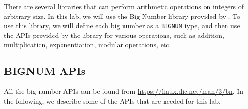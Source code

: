 There are several libraries that can perform arithmetic operations on integers of 
arbitrary size. In this lab, we will use the Big Number library provided 
by \openssl. To use this library, we will define each big number as 
a \texttt{BIGNUM} type, and then use the APIs provided by the library
for various operations, such as addition, multiplication, exponentiation, 
modular operations, etc. 



\subsection{BIGNUM APIs}

All the big number APIs can be found from 
\url{https://linux.die.net/man/3/bn}. In the following, 
we describe some of the APIs that are needed for this lab.




